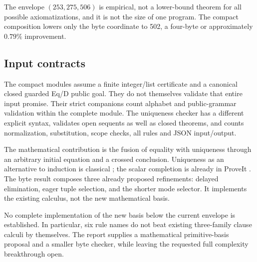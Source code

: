 The envelope $(253,275,506)$ is empirical, not a lower-bound theorem for
all possible axiomatizations, and it is not the size of one program.
The compact composition lowers only the byte coordinate to 502, a
four-byte or approximately $0.79\%$ improvement.

\subsection{Input contracts}
The compact modules assume a finite integer/list certificate and a
canonical closed guarded Eq/D public goal. They do not themselves
validate that entire input promise. Their strict companions count
alphabet and public-grammar validation within the complete module.
The uniqueness checker has a different explicit syntax, validates open
sequents as well as closed theorems, and counts normalization,
substitution, scope checks, all rules and JSON input/output.

The mathematical contribution is the fusion of equality with uniqueness
through an arbitrary initial equation and a crossed conclusion.
Uniqueness as an alternative to induction is classical
\cite{goodstein,tait}; the scalar completion is already in ProveIt
\cite{ur}. The byte result composes three already proposed refinements:
delayed elimination, eager tuple selection, and the shorter mode selector.
It implements the existing calculus, not the new mathematical basis.

No complete implementation of the new basis below the current envelope
is established. In particular, six rule names do not beat existing
three-family clause calculi by themselves. The report supplies a
mathematical primitive-basis proposal and a smaller byte checker, while
leaving the requested full complexity breakthrough open.


